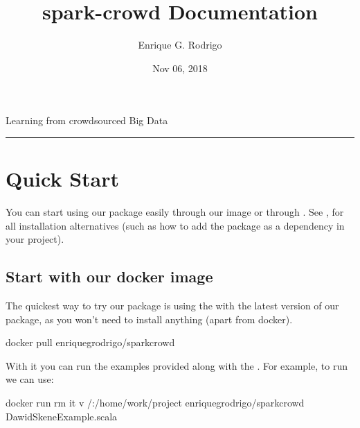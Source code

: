 \documentclass[letterpaper,10pt,english]{sphinxmanual}
\title{spark-crowd Documentation}
\date{Nov 06, 2018}
\author{Enrique G. Rodrigo}
\begin{document}
\pagestyle{empty}
\maketitle
\pagestyle{plain}
\sphinxtableofcontents
\pagestyle{normal}
\label{\detokenize{index::doc}}


Learning from crowdsourced Big Data


\bigskip\hrule\bigskip



\chapter{Quick Start}
\label{\detokenize{usage/quickstart:quick-start}}\label{\detokenize{usage/quickstart:quickstart}}\label{\detokenize{usage/quickstart::doc}}
You can start using our package easily through our  image or through .
See {\hyperref[\detokenize{usage/installation:installation}]{}}, for all installation alternatives (such as how to add the package as a dependency in your project).


\section{Start with our docker image}
\label{\detokenize{usage/quickstart:start-with-our-docker-image}}
The quickest way to try our package is using the
 with the latest version of
our package, as you won’t need to install anything (apart from docker).

%
\begin{sphinxVerbatim}[commandchars=\\\{\}]
docker pull enriquegrodrigo/spark\PYGZhy{}crowd
\end{sphinxVerbatim}

With it you can run the examples provided along with the
. For example,
to run  we can use:

%
\begin{sphinxVerbatim}[commandchars=\\\{\}]
docker run \PYGZhy{}\PYGZhy{}rm \PYGZhy{}it \PYGZhy{}v /:/home/work/project enriquegrodrigo/spark\PYGZhy{}crowd DawidSkeneExample.scala
\end{sphinxVerbatim}
\end{document}
